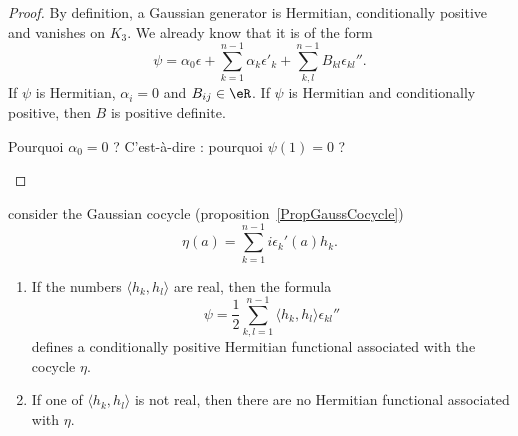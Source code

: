 \begin{proof}
    By definition, a Gaussian generator is Hermitian, conditionally positive and vanishes on $K_3$. We already know that it is of the form
    \begin{equation}        \label{EqFormgenpsiGauss}
        \psi=\alpha_0\epsilon+\sum_{k=1}^{n-1}\alpha_k\epsilon'_k+\sum_{k,l}^{n-1}B_{kl}\epsilon_{kl}''.
    \end{equation}
    If $\psi$ is Hermitian, $\alpha_i=0$ and $B_{ij}\in \eR$. If $\psi$ is Hermitian and conditionally positive, then $B$ is positive definite.

    \begin{probleme}
        Pourquoi $\alpha_0=0$ ? C'est-à-dire : pourquoi $\psi(1)=0$ ?
    \end{probleme}

\end{proof}

\begin{proposition}
    consider the Gaussian cocycle (proposition~\ref{PropGaussCocycle})
    \begin{equation}
        \eta(a)=\sum_{k=1}^{n-1}i\epsilon_k'(a)h_k.
    \end{equation}
    \begin{enumerate}
        \item
            If the numbers $\langle h_k, h_l\rangle $ are real, then the formula
            \begin{equation}
                \psi=\frac{ 1 }{2}\sum_{k,l=1}^{n-1}\langle h_k, h_l\rangle \epsilon_{kl}''
            \end{equation}
            defines a conditionally positive Hermitian functional associated with the cocycle $\eta$.

        \item
            If one of $\langle h_k, h_l\rangle $ is not real, then there are no Hermitian functional associated with $\eta$.
    \end{enumerate}

\end{proposition}

